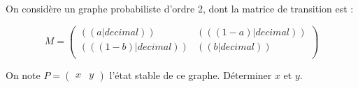 \exercice
On considère un graphe probabiliste d'ordre 2, dont la matrice de transition est :

\[
M=\begin{pmatrix}
(( a | decimal )) & (( (1-a) | decimal )) \\
(( (1-b) | decimal )) & (( b | decimal )) \\
\end{pmatrix}
\]

On note $P=\begin{pmatrix}x&y\end{pmatrix}$ l'état stable de ce graphe. Déterminer $x$ et $y$.
